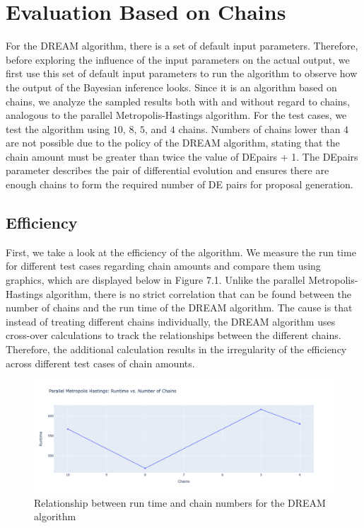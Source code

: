 \section{Evaluation Based on Chains}
For the DREAM algorithm, there is a set of default input parameters. Therefore, before exploring the influence of the input parameters on the actual output, we first use this set of default input parameters to run the algorithm to observe how the output of the Bayesian inference looks. Since it is an algorithm based on chains, we analyze the sampled results both with and without regard to chains, analogous to the parallel Metropolis-Hastings algorithm. For the test cases, we test the algorithm using $10$, $8$, $5$, and $4$ chains. Numbers of chains lower than $4$ are not possible due to the policy of the DREAM algorithm, stating that the chain amount must be greater than twice the value of DEpairs + 1. The DEpairs parameter describes the pair of differential evolution and ensures there are enough chains to form the required number of DE pairs for proposal generation.


\subsection{Efficiency}
First, we take a look at the efficiency of the algorithm. We measure the run time for different test cases regarding chain amounts and compare them using graphics, which are displayed below in Figure 7.1. Unlike the parallel Metropolis-Hastings algorithm, there is no strict correlation that can be found between the number of chains and the run time of the DREAM algorithm. The cause is that instead of treating different chains individually, the DREAM algorithm uses cross-over calculations to track the relationships between the different chains. Therefore, the additional calculation results in the irregularity of the efficiency across different test cases of chain amounts.

\begin{figure}[H]
    \centering
    \includegraphics[width=1\textwidth]{figures/dream/runtime.png}
    \captionsetup{width=.8\textwidth}
    \caption{Relationship between run time and chain numbers for the DREAM algorithm}
    \label{fig:enter-label}
\end{figure}
